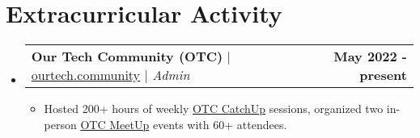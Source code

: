 \documentclass[letterpaper,11pt]{article}
\makeatletter
\newcommand{\resumeItem}[1]{
  \item\small{
    {#1 \vspace{-2pt}}
  }
}
\newcommand{\resumeProjectHeading}[2]{
    \item
    \begin{tabular*}{1.001\textwidth}{l@{\extracolsep{\fill}}r}
      \small#1 & \textbf{\small #2}\\
    \end{tabular*}\vspace{-7pt}
}
\newcommand{\resumeSubHeadingListStart}{\begin{itemize}[leftmargin=0.0in, label={}]}
\newcommand{\resumeSubHeadingListEnd}{\end{itemize}}
\newcommand{\resumeItemListStart}{\begin{itemize}}
\newcommand{\resumeItemListEnd}{\end{itemize}\vspace{-5pt}}
\makeatother
\begin{document}



\section{Extracurricular Activity}
    \vspace{-7pt}
    \resumeSubHeadingListStart
        \resumeProjectHeading
            {\textbf{\normalsize{Our Tech Community (OTC)}} $|$ \normalfont\href{https://ourtech.community}{ourtech.community} $|$ \emph{Admin}}{May 2022 - present}
            \resumeItemListStart
                \resumeItem{Hosted 200+ hours of weekly \href{https://catchup.ourtech.community}{OTC CatchUp} sessions, organized two in-person \href{https://meetup.ourtech.community}{OTC MeetUp} events with 60+ attendees.}
            \resumeItemListEnd
        \vspace{-18pt}



    \resumeSubHeadingListEnd
\vspace{-8pt}
\end{document}

